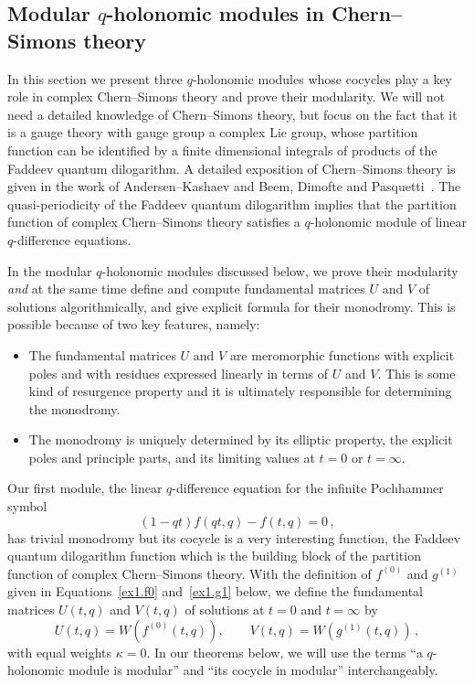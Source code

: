 \documentclass[12pt,reqno]{amsart}
\theoremstyle{definition}
\def\be{\begin{equation}}
\def\ee{\end{equation}}
\begin{document}
\subsection{Modular $q$-holonomic modules in Chern--Simons theory}

In this section we present three $q$-holonomic modules whose cocycles play a key
role in complex Chern--Simons theory and prove their modularity. We will not need
a detailed knowledge of Chern--Simons theory, but focus on the fact that it is a
gauge theory with gauge group a complex Lie group, whose partition function
can be identified by a finite dimensional integrals of products of the Faddeev
quantum dilogarithm. A detailed exposition of Chern--Simons theory is given in the
work of Andersen--Kashaev and Beem, Dimofte and Pasquetti~\cite{AK,Dimofte:complex,
  Beem,Pasquetti}. The quasi-periodicity of the Faddeev quantum dilogarithm implies
that the partition function of complex Chern--Simons theory satisfies a
$q$-holonomic module of linear $q$-difference equations.

In the modular $q$-holonomic modules discussed below, we prove their modularity
\emph{and} at the same time define and compute fundamental matrices $U$ and $V$
of solutions algorithmically, and give explicit formula for their monodromy.
This is possible because of two key features, namely:
\begin{itemize}
\item[(a)]
  The fundamental matrices $U$ and $V$ are meromorphic functions with explicit
  poles and with residues expressed linearly in terms of $U$ and $V$.
  This is some kind of resurgence property and it is ultimately responsible for
  determining the monodromy.
\item[(b)]
  The monodromy is uniquely determined by its elliptic property, the explicit
  poles and principle parts, and its limiting values at $t=0$ or $t=\infty$. 
\end{itemize}

Our first module, the linear $q$-difference equation for the infinite
Pochhammer symbol
\be
\label{ex1}
(1-qt)f(qt,q)-f(t,q)=0 \,,
\ee
has trivial monodromy but its cocycle is a very interesting function, the Faddeev
quantum dilogarithm function which is the building block of the partition function
of complex Chern--Simons theory. With the definition of $f^{(0)}$ and $g^{(1)}$ given
in Equations~\eqref{ex1.f0} and~\eqref{ex1.g1} below, we define the fundamental
matrices $U(t,q)$ and $V(t,q)$ of solutions at $t=0$ and $t=\infty$ by 
\be
\label{UVex1}
U(t,q) = W(f^{(0)}(t,q)), \qquad
V(t,q) = W(g^{(1)}(t,q)) \,,
\ee
with equal weights $\kappa = 0$. In our theorems below,
we will use the terms ``a $q$-holonomic module is modular'' and ``its cocycle
in modular'' interchangeably. 
\end{document}
